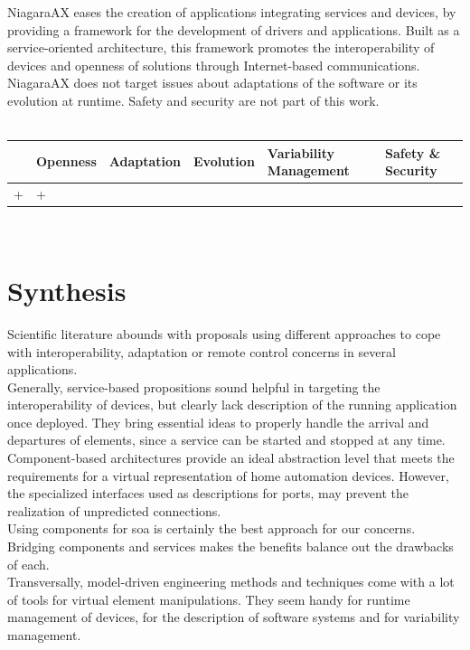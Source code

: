 NiagaraAX eases the creation of applications integrating services and devices, by providing a framework for the development of drivers and applications. Built as a service-oriented architecture, this framework promotes the interoperability of devices and openness of solutions through Internet-based communications. NiagaraAX does not target issues about adaptations of the software or its evolution at runtime. Safety and security are not part of this work.\\
 \\
\begin{tabular}{ >{\centering}m{}| >{\centering}m{} >{\centering}m{}| >{\centering}m{} >{\centering}m{}| >{\centering\arraybackslash}m{}}
{\tiny Interoperability} & {\tiny Openness} & {\tiny Adaptation} & {\tiny Evolution} & {\tiny Variability Management} & {\tiny Safety \& Security}\\
 \hline
 + & + &  &  &  & \\ 
  \hline
\end{tabular}\\





\chapter{Synthesis}
\label{ch:summary}

Scientific literature abounds with proposals using different approaches to cope with interoperability, adaptation or remote control concerns in several applications.\\
Generally, service-based propositions sound helpful in targeting the interoperability of devices, but clearly lack description of the running application once deployed. They bring essential ideas to properly handle the arrival and departures of elements, since a service can be started and stopped at any time.\\
Component-based architectures provide an ideal abstraction level that meets the requirements for a virtual representation of home automation devices. 
However, the specialized interfaces used as descriptions for ports, may prevent the realization of unpredicted connections.\\
Using components for \gls{soa} is certainly the best approach for our concerns. Bridging components and services makes the benefits balance out the drawbacks of each.\\
Transversally, model-driven engineering methods and techniques come with a lot of tools for virtual element manipulations. They seem handy for runtime management of devices, for the description of software systems and for variability management.\\


